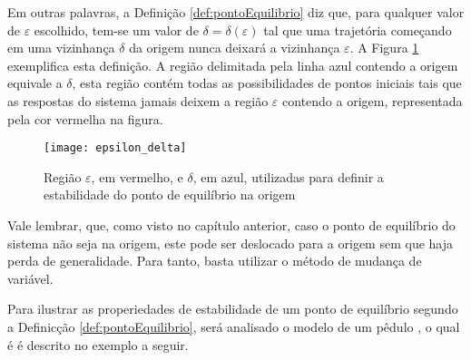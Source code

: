 Em outras palavras, a Definição \ref{def:pontoEquilibrio} diz que, para qualquer valor de $\varepsilon$ escolhido, tem-se um valor de $\delta = \delta(\varepsilon)$ tal que uma trajetória começando em uma vizinhança $\delta$ da origem nunca deixará a vizinhança $\varepsilon$. A Figura \ref{fig:epsilon_delta} exemplifica esta definição. A região delimitada pela linha azul contendo a origem equivale a $\delta$, esta região contém todas as possibilidades de pontos iniciais tais que as respostas do sistema jamais deixem a região $\varepsilon$ contendo a origem, representada pela cor vermelha na figura.

\begin{figure}[htbp]
	\centering
	\texttt{[image: epsilon\_delta]}
	\caption{Região $\varepsilon$, em vermelho, e $\delta$, em azul, utilizadas para definir a estabilidade do ponto de equilíbrio na origem}
	 \label{fig:epsilon_delta}
\end{figure}

Vale lembrar, que, como visto no capítulo anterior, caso o ponto de equilíbrio do sistema não seja na origem, este pode ser deslocado para a origem sem que haja perda de generalidade. Para tanto, basta utilizar o método de mudança de variável.

Para ilustrar as properiedades de estabilidade de um ponto de equilíbrio segundo a Definicção \ref{def:pontoEquilibrio}, será analisado o modelo de um pêdulo \cite{bookkhalil:2003}, o qual é é descrito no exemplo a seguir.

